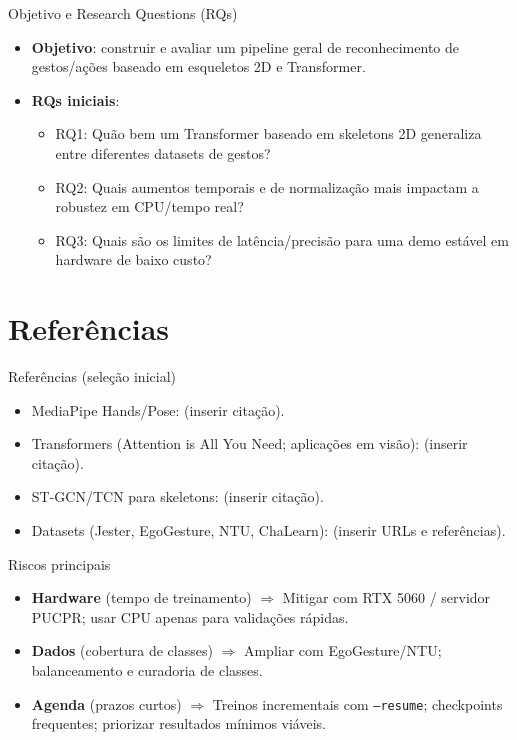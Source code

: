 \documentclass[aspectratio=169]{beamer}
\begin{document}
\begin{frame}{Objetivo e Research Questions (RQs)}
  \begin{itemize}
    \item \textbf{Objetivo}: construir e avaliar um pipeline geral de reconhecimento de gestos/ações baseado em esqueletos 2D e Transformer.
    \item \textbf{RQs iniciais}:
      \begin{itemize}
        \item RQ1: Quão bem um Transformer baseado em skeletons 2D generaliza entre diferentes datasets de gestos?
        \item RQ2: Quais aumentos temporais e de normalização mais impactam a robustez em CPU/tempo real?
        \item RQ3: Quais são os limites de latência/precisão para uma demo estável em hardware de baixo custo?
      \end{itemize}
  \end{itemize}
\end{frame}

\section{Referências}
\begin{frame}{Referências (seleção inicial)}
  \small
  \begin{itemize}
    \item MediaPipe Hands/Pose: (inserir citação).
    \item Transformers (Attention is All You Need; aplicações em visão): (inserir citação).
    \item ST-GCN/TCN para skeletons: (inserir citação).
    \item Datasets (Jester, EgoGesture, NTU, ChaLearn): (inserir URLs e referências).
  \end{itemize}
\end{frame}
\begin{frame}{Riscos principais}
  \begin{itemize}
  \item \textbf{Hardware} (tempo de treinamento) $\Rightarrow$ Mitigar com RTX 5060 / servidor PUCPR; usar CPU apenas para validações rápidas.
  \item \textbf{Dados} (cobertura de classes) $\Rightarrow$ Ampliar com EgoGesture/NTU; balanceamento e curadoria de classes.
  \item \textbf{Agenda} (prazos curtos) $\Rightarrow$ Treinos incrementais com \texttt{--resume}; checkpoints frequentes; priorizar resultados mínimos viáveis.
  \end{itemize}
\end{frame}
\end{document}
